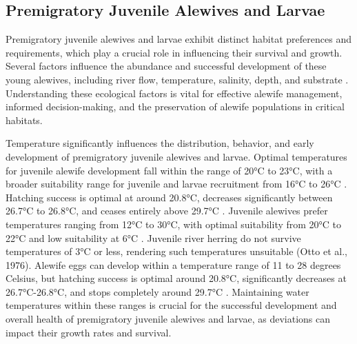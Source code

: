\documentclass[
]{book}
\begin{document}
\hypertarget{premigratory-juvenile-alewives-and-larvae}{%
\subsection{Premigratory Juvenile Alewives and Larvae}\label{premigratory-juvenile-alewives-and-larvae}}

Premigratory juvenile alewives and larvae exhibit distinct habitat preferences and requirements, which play a crucial role in influencing their survival and growth. Several factors influence the abundance and successful development of these young alewives, including river flow, temperature, salinity, depth, and substrate \citep{pardue_habitat_1983, walsh_early_2005, tommasi_effect_2015}. Understanding these ecological factors is vital for effective alewife management, informed decision-making, and the preservation of alewife populations in critical habitats.

Temperature significantly influences the distribution, behavior, and early development of premigratory juvenile alewives and larvae. Optimal temperatures for juvenile alewife development fall within the range of 20°C to 23°C, with a broader suitability range for juvenile and larvae recruitment from 16°C to 26°C \citep{fay_alewifeblueback_1983, tommasi_effect_2015}. Hatching success is optimal at around 20.8°C, decreases significantly between 26.7°C to 26.8°C, and ceases entirely above 29.7°C \citep{pardue_habitat_1983}. Juvenile alewives prefer temperatures ranging from 12°C to 30°C, with optimal suitability from 20°C to 22°C and low suitability at 6°C \citep{pardue_habitat_1983, brown_habitat_2000, able_alewife_2020}. Juvenile river herring do not survive temperatures of 3°C or less, rendering such temperatures unsuitable (Otto et al., 1976). Alewife eggs can develop within a temperature range of 11 to 28 degrees Celsius, but hatching success is optimal around 20.8°C, significantly decreases at 26.7°C-26.8°C, and stops completely around 29.7°C \citep{pardue_habitat_1983, klauda_alewife_1991}. Maintaining water temperatures within these ranges is crucial for the successful development and overall health of premigratory juvenile alewives and larvae, as deviations can impact their growth rates and survival.
\end{document}
